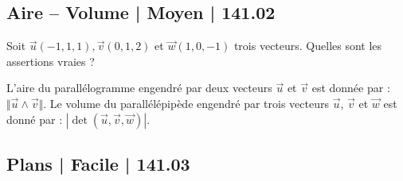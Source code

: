 \subsection{Aire -- Volume | Moyen | 141.02}
 
 
\begin{question} 
Soit $\vec{u}(-1,1,1), \vec{v}(0,1,2)$ et $\vec{w}(1,0,-1)$ trois vecteurs. Quelles sont les assertions vraies ?
\begin{answers}

      
      


\end{answers}
\begin{explanations}
L'aire du parallélogramme engendré par deux vecteurs $\vec{u}$ et $\vec{v}$ est donnée par : $ \Vert \vec{u} \wedge \vec{v} \Vert$.
Le volume du parallélépipède engendré par trois vecteurs $\vec{u}$, $\vec{v}$ et  $\vec{w}$ est donné par : $|\det (\vec{u}, \vec{v},\vec{w})|$.
\end{explanations}

\end{question}

\subsection{Plans | Facile | 141.03}


